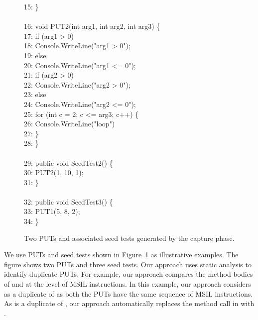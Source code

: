 \begin{figure}[t]
\begin{CodeOut}
15: \}\\
\\
16: void PUT2(int arg1, int arg2, int arg3) \{\\
17: \hspace*{0.2in}if (arg1 > 0)\\
18: \hspace*{0.4in}Console.WriteLine("arg1 > 0"); \\
19: \hspace*{0.2in}else\\
20: \hspace*{0.4in}Console.WriteLine("arg1 <= 0"); \\
21: \hspace*{0.2in}if (arg2 > 0)\\
22: \hspace*{0.4in}Console.WriteLine("arg2 > 0");  \\
23: \hspace*{0.2in}else\\
24: \hspace*{0.4in}Console.WriteLine("arg2 <= 0"); \\
25: \hspace*{0.2in}for (int c = 2; c <= arg3; c++)  \{ \\
26: \hspace*{0.4in}Console.WriteLine("loop") \\
27: \hspace*{0.2in}\}\\
28: \}\\
\\
29: public void SeedTest2() \{\\
30: \hspace*{0.2in}PUT2(1, 10, 1);\\
31: \}\\
\\
32: public void SeedTest3() \{\\
33: \hspace*{0.2in}PUT1(5, 8, 2);\\
34: \}\\
\end{CodeOut}\vspace*{-2ex}
\caption{\label{fig:samplePutAndUT}Two PUTs and associated seed tests generated by the capture phase.}\vspace*{-2ex}
\end{figure}

We use PUTs and seed tests shown in Figure~\ref{fig:samplePutAndUT} as 
illustrative examples. The figure shows two PUTs
and three seed tests. Our approach uses static analysis to identify duplicate
PUTs. For example, our approach compares the method bodies of  and
 at the level of MSIL instructions. In this example, 
our approach considers  as a duplicate of 
as both the PUTs have the same sequence of MSIL instructions.
As  is a duplicate of , our approach automatically replaces
the  method call in  with .


